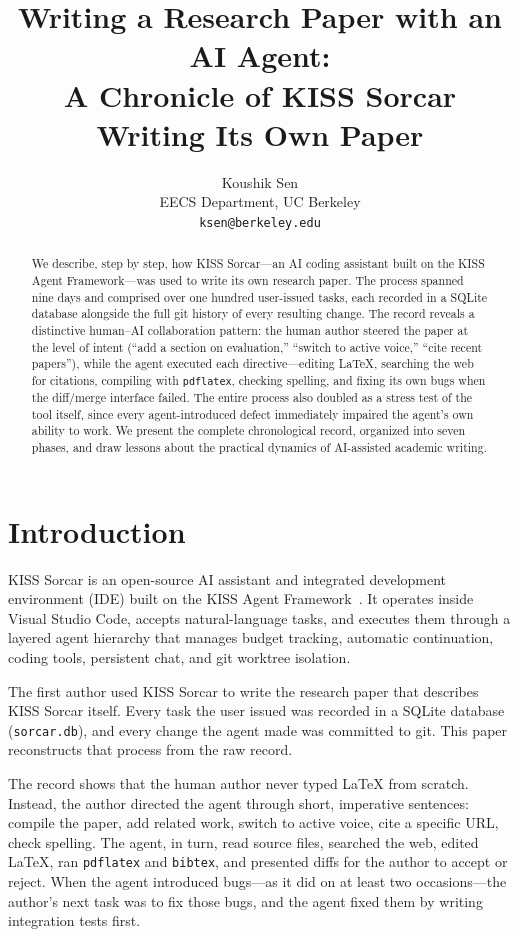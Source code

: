 \documentclass{article}
\title{Writing a Research Paper with an AI Agent:\\A Chronicle of KISS Sorcar Writing Its Own Paper}
\author{%
Koushik Sen \\ EECS Department, UC Berkeley\\ \texttt{ksen@berkeley.edu} \\
}
\begin{document}
\maketitle

\begin{abstract}
We describe, step by step, how KISS Sorcar---an AI coding assistant built on the KISS Agent Framework---was used to write its own research paper.  The process spanned nine days and comprised over one hundred user-issued tasks, each recorded in a SQLite database alongside the full git history of every resulting change.  The record reveals a distinctive human--AI collaboration pattern: the human author steered the paper at the level of intent (``add a section on evaluation,'' ``switch to active voice,'' ``cite recent papers''), while the agent executed each directive---editing \LaTeX{}, searching the web for citations, compiling with \texttt{pdflatex}, checking spelling, and fixing its own bugs when the diff/merge interface failed.  The entire process also doubled as a stress test of the tool itself, since every agent-introduced defect immediately impaired the agent's own ability to work.  We present the complete chronological record, organized into seven phases, and draw lessons about the practical dynamics of AI-assisted academic writing.
\end{abstract}

\section{Introduction}
\label{sec:intro}

KISS Sorcar is an open-source AI assistant and integrated development environment (IDE) built on the KISS Agent Framework~\cite{sen2026kiss}.  It operates inside Visual Studio Code, accepts natural-language tasks, and executes them through a layered agent hierarchy that manages budget tracking, automatic continuation, coding tools, persistent chat, and git worktree isolation.

The first author used KISS Sorcar to write the research paper that describes KISS Sorcar itself.  Every task the user issued was recorded in a SQLite database (\texttt{sorcar.db}), and every change the agent made was committed to git.  This paper reconstructs that process from the raw record. 

The record shows that the human author never typed \LaTeX{} from scratch.  Instead, the author directed the agent through short, imperative sentences: compile the paper, add related work, switch to active voice, cite a specific URL, check spelling.  The agent, in turn, read source files, searched the web, edited \LaTeX{}, ran \texttt{pdflatex} and \texttt{bibtex}, and presented diffs for the author to accept or reject.  When the agent introduced bugs---as it did on at least two occasions---the author's next task was to fix those bugs, and the agent fixed them by writing integration tests first.
\end{document}
